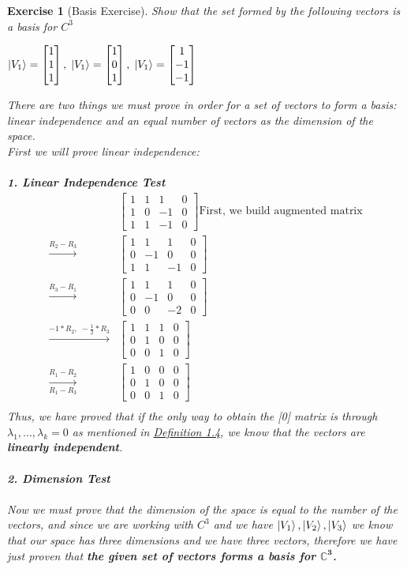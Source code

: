 \documentclass[12pt]{article}
\theoremstyle{plain}
\theoremstyle{nonumberplain}
\theoremstyle{plain}
\newtheorem{exercise}[lemma]{Exercise}
\theoremstyle{nonumberplain}
\newcommand\1{{\bf 1}}
\newcommand{\bmat}[1]{\begin{bmatrix*} #1 \end{bmatrix*}} %
\newcommand{\C}{\mathbb{C}} %
\newcommand{\<}{\left\langle}
\renewcommand{\>}{\right\rangle}
\begin{document}
\begin{exercise} [Basis Exercise]
Show that the set formed by the following vectors is a basis for $C^3$\\
\begin{center}$
\ket{V_1} = \bmat{1\\ 1\\ 1},\; \ket{V_1} = \bmat{1\\ 0\\ 1},\; \ket{V_1} = \bmat{1\\ -1\\ -1}\; 
$\\
\end{center}
There are two things we must prove in order for a set of vectors to form a basis: linear independence and an equal number of vectors as the dimension of the space.\\
First we will prove linear independence:\\\\
\textbf{1. Linear Independence Test}
\begin{equation}
\begin{split}
	&\bmat{1& 1& 1& 0\\ 1& 0& -1& 0\\ 1& 1& -1& 0} \text{First, we build augmented matrix}\\
	\xrightarrow{R_2 - R_3} &\bmat{1& 1& 1& 0\\ 0& -1& 0& 0\\ 1& 1& -1& 0}\\
	\xrightarrow{R_3 - R_1} &\bmat{1& 1& 1& 0\\ 0& -1& 0& 0\\ 0& 0& -2& 0}\\
	\xrightarrow{-1*R_2,\;-\tfrac{1}{2}*R_3} &\bmat{1& 1& 1& 0\\ 0& 1& 0& 0\\ 0& 0& 1& 0}\\
	\xrightarrow[R_1 - R_3]{R_1 - R_2} &\bmat{1& 0& 0& 0\\ 0& 1& 0& 0\\ 0& 0& 1& 0}\\ 
\end{split}
\end{equation}
Thus, we have proved that if the only way to obtain the [0] matrix is through $\lambda_1, ... , \lambda_k = 0$ as mentioned in \hyperref[def:Independence]{Definition 1.4}, we know that the vectors are \textbf{linearly independent}.\\ 
\\
\textbf{2. Dimension Test}
\\\\
Now we must prove that the dimension of the space is equal to the number of the vectors, and since we are working with $C^3$ and we have $\ket{V_1}, \ket{V_2}, \ket{V_3}$ we know that our space has three dimensions and we have three vectors, therefore we have just proven that \textbf{the given set of vectors forms a basis for $\mathbf{\C^3}$.}
\end{exercise}
\pagebreak
\end{document}
